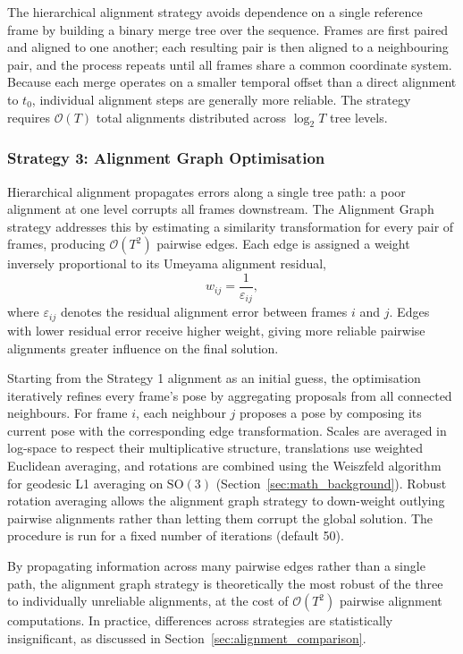 The hierarchical alignment strategy avoids dependence on a single reference frame by building a
binary merge tree over the sequence. Frames are first paired and aligned to one another;
each resulting pair is then aligned to a neighbouring pair, and the process repeats until
all frames share a common coordinate system. Because each merge operates on a smaller
temporal offset than a direct alignment to $t_0$, individual alignment steps are generally
more reliable. The strategy requires $\mathcal{O}(T)$ total alignments distributed across
$\log_2 T$ tree levels.

\subsubsection{Strategy 3: Alignment Graph Optimisation}
\label{sec:strategy3}

Hierarchical alignment propagates errors along a single tree path: a poor alignment at one
level corrupts all frames downstream. The Alignment Graph strategy addresses this by estimating
a similarity transformation for every pair of frames, producing $\mathcal{O}(T^2)$
pairwise edges. Each edge is assigned a weight inversely proportional to its Umeyama
alignment residual,
\begin{equation}
    w_{ij} = \frac{1}{\varepsilon_{ij}},
\end{equation}
where $\varepsilon_{ij}$ denotes the residual alignment error between frames $i$ and $j$.
Edges with lower residual error receive higher weight, giving more reliable pairwise
alignments greater influence on the final solution.

Starting from the Strategy 1 alignment as an initial guess, the optimisation iteratively
refines every frame's pose by aggregating proposals from all connected neighbours. For
frame $i$, each neighbour $j$ proposes a pose by composing its current pose with the
corresponding edge transformation. Scales are averaged in log-space to respect their
multiplicative structure, translations use weighted Euclidean averaging, and rotations are
combined using the Weiszfeld algorithm for geodesic L1 averaging on $\mathrm{SO}(3)$
(Section~\ref{sec:math_background}). Robust rotation averaging allows the alignment graph
strategy to down-weight outlying pairwise alignments rather than letting them corrupt the
global solution. The procedure is run for a fixed number of iterations (default 50).

By propagating information across many pairwise edges rather than a single path,
the alignment graph strategy is theoretically the most robust of the three to
individually unreliable alignments, at the cost of $\mathcal{O}(T^2)$ pairwise
alignment computations. In practice, differences across strategies are
statistically insignificant, as discussed in Section~\ref{sec:alignment_comparison}.

